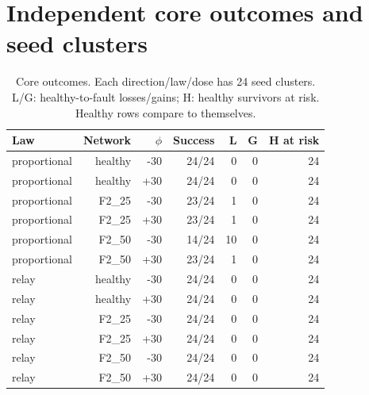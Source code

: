 \documentclass[10pt,letterpaper]{article}
\begin{document}
\section{Independent core outcomes and seed clusters}

\begin{table}[H]
\centering\small
\caption{Core outcomes. Each direction/law/dose has 24 seed clusters. L/G: healthy-to-fault losses/gains; H: healthy survivors at risk. Healthy rows compare to themselves.}
\begin{tabular}{lrrrrrr}
\toprule
Law & Network & $\phi$ & Success & L & G & H at risk\\
\midrule
proportional & healthy & -30 & 24/24 & 0 & 0 & 24\\
proportional & healthy & +30 & 24/24 & 0 & 0 & 24\\
proportional & F2\_25 & -30 & 23/24 & 1 & 0 & 24\\
proportional & F2\_25 & +30 & 23/24 & 1 & 0 & 24\\
proportional & F2\_50 & -30 & 14/24 & 10 & 0 & 24\\
proportional & F2\_50 & +30 & 23/24 & 1 & 0 & 24\\
relay & healthy & -30 & 24/24 & 0 & 0 & 24\\
relay & healthy & +30 & 24/24 & 0 & 0 & 24\\
relay & F2\_25 & -30 & 24/24 & 0 & 0 & 24\\
relay & F2\_25 & +30 & 24/24 & 0 & 0 & 24\\
relay & F2\_50 & -30 & 24/24 & 0 & 0 & 24\\
relay & F2\_50 & +30 & 24/24 & 0 & 0 & 24\\
\bottomrule
\end{tabular}
\end{table}
\end{document}
